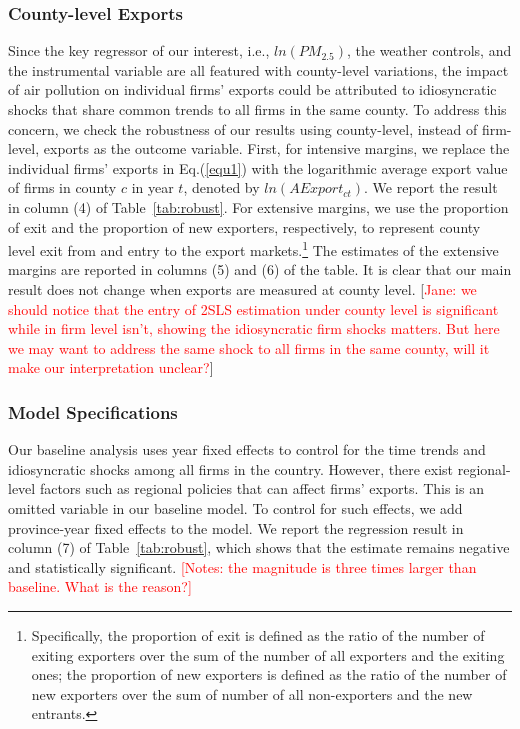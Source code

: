 \documentclass[12pt]{article}
\begin{document}
\subsubsection{County-level Exports}
Since the key regressor of our interest,  i.e., $ln(PM_{2.5})$, the weather
controls, and the instrumental variable are all featured with county-level
variations, the impact of air pollution on individual firms' exports could
be attributed to idiosyncratic shocks that share common trends to all firms
in the same county. To address this concern, we check the robustness of our
results using county-level, instead of firm-level, exports as the outcome
variable. First, for intensive margins, we
replace the individual firms' exports in Eq.(\ref{equ1}) with the
logarithmic average export value of firms in county $c$ in year $t$, denoted
by $ln(AExport_{ct})$. We report the result in column (4) of Table~\ref{tab:robust}. For extensive margins, we use 
the proportion of exit and the proportion of new exporters, respectively, to represent county level exit from and entry to the export markets.\footnote{Specifically, the proportion of exit is defined as 
the ratio of the number of
exiting exporters over the sum of the number of all exporters and the exiting
ones; the proportion of new exporters is defined as 
the ratio of the number of new exporters over the sum of number of all non-exporters and the new entrants.} The estimates of
the extensive margins are reported in columns (5) and (6) of the table. It
is clear that our main result does not change when exports are measured at
county level. [\textcolor{red}{Jane: we should notice that the entry of 2SLS estimation under county level is significant while in firm level isn't, showing the idiosyncratic firm shocks matters. But here we may want to address the same shock to all firms in the same county, will it make our interpretation unclear?}]

\subsubsection{Model Specifications}
Our baseline analysis uses year fixed effects to control for the time trends
and idiosyncratic shocks among all firms in the country. However, there
exist regional-level factors such as regional policies that can affect
firms' exports. This is an omitted variable in our baseline model. To
control for such effects, we add province-year fixed effects to the model.
We report the regression result in column (7) of Table~\ref{tab:robust},
which shows that the estimate remains negative and statistically
significant. 
\textcolor{red}{[Notes: the magnitude
is three times larger than baseline. What is the reason?]}
\end{document}
